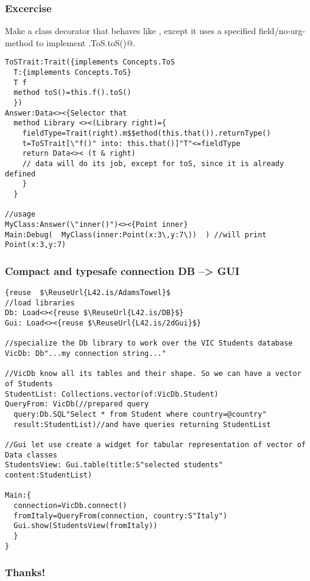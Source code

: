 \begin{frame}[fragile]
\frametitle{Excercise}
Make a class decorator that behaves like \Q@Data@, except it
uses a specified field/no-arg-method to implement \Q@Concepts.ToS.toS()@.
\begin{NiceCode}{59ex}{0.7}
\begin{lstlisting}
ToSTrait:Trait({implements Concepts.ToS
  T:{implements Concepts.ToS}
  T f
  method toS()=this.f().toS()
  })
Answer:Data<><{Selector that
  method Library <><(Library right)={
    fieldType=Trait(right).m$$ethod(this.that()).returnType()
    t=ToSTrait[\"f()" into: this.that()]"T"<=fieldType
    return Data<>< (t & right) 
    // data will do its job, except for toS, since it is already defined
    }
  }

//usage
MyClass:Answer(\"inner()")<><{Point inner}
Main:Debug(  MyClass(inner:Point(x:3\,y:7\))  ) //will print Point(x:3,y:7)
\end{lstlisting}
\end{NiceCode}
\end{frame}


\begin{frame}[fragile]
\frametitle{Compact and typesafe connection DB --> GUI}
\begin{NiceCode}{59ex}{0.7}
\begin{lstlisting}
{reuse  $\ReuseUrl{L42.is/AdamsTowel}$
//load libraries
Db: Load<><{reuse $\ReuseUrl{L42.is/DB}$}
Gui: Load<><{reuse $\ReuseUrl{L42.is/2dGui}$}

//specialize the Db library to work over the VIC Students database
VicDb: Db"...my connection string..."

//VicDb know all its tables and their shape. So we can have a vector of Students
StudentList: Collections.vector(of:VicDb.Student)
QueryFrom: VicDb(//prepared query
  query:Db.SQL"Select * from Student where country=@country"
  result:StudentList)//and have queries returning StudentList

//Gui let use create a widget for tabular representation of vector of Data classes
StudentsView: Gui.table(title:S"selected students" content:StudentList)

Main:{
  connection=VicDb.connect()
  fromItaly=QueryFrom(connection, country:S"Italy")
  Gui.show(StudentsView(fromItaly))
  }
}
\end{lstlisting}
\end{NiceCode}
\end{frame}



\begin{frame}[fragile]
\frametitle{ Thanks! }
\end{frame}

